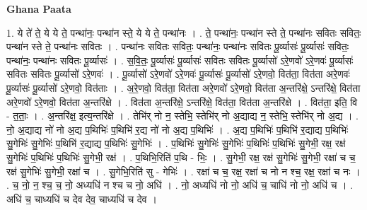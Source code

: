 \documentclass[17pt]{extarticle}
\begin{document}
\textbf{Ghana Paata } \newline

1. ये ते॑ ते॒ ये ये ते॒ पन्था॑नः॒ पन्था॑न स्ते॒ ये ये ते॒ पन्था॑नः । . ते॒ पन्था॑नः॒ पन्था॑न स्ते ते॒ पन्था॑नः सवितः सवितः॒ पन्था॑न स्ते ते॒ पन्था॑नः सवितः । . पन्था॑नः सवितः सवितः॒ पन्था॑नः॒ पन्था॑नः सवितः पू॒र्व्यासः॑ पू॒र्व्यासः॑ सवितः॒ पन्था॑नः॒ पन्था॑नः सवितः पू॒र्व्यासः॑ । . स॒वि॒तः॒ पू॒र्व्यासः॑ पू॒र्व्यासः॑ सवितः सवितः पू॒र्व्यासो॑ ऽरे॒णवो॑ ऽरे॒णवः॑ पू॒र्व्यासः॑ सवितः सवितः पू॒र्व्यासो॑ ऽरे॒णवः॑ । . पू॒र्व्यासो॑ ऽरे॒णवो॑ ऽरे॒णवः॑ पू॒र्व्यासः॑ पू॒र्व्यासो॑ ऽरे॒णवो॒ वित॑ता॒ वित॑ता अरे॒णवः॑ पू॒र्व्यासः॑ पू॒र्व्यासो॑ ऽरे॒णवो॒ वित॑ताः । . अ॒रे॒णवो॒ वित॑ता॒ वित॑ता अरे॒णवो॑ ऽरे॒णवो॒ वित॑ता अ॒न्तरि॑क्षे॒ ऽन्तरि॑क्षे॒ वित॑ता अरे॒णवो॑ ऽरे॒णवो॒ वित॑ता अ॒न्तरि॑क्षे । . वित॑ता अ॒न्तरि॑क्षे॒ ऽन्तरि॑क्षे॒ वित॑ता॒ वित॑ता अ॒न्तरि॑क्षे । . वित॑ता॒ इति॒ वि - त॒ताः॒ । . अ॒न्तरि॑क्ष॒ इत्य॒न्तरि॑क्षे । . तेभि॑र् नो न॒ स्तेभि॒ स्तेभि॑र् नो अ॒द्याद्य न॒ स्तेभि॒ स्तेभि॑र् नो अ॒द्य । . नो॒ अ॒द्याद्य नो॑ नो अ॒द्य प॒थिभिः॑ प॒थिभि॑ र॒द्य नो॑ नो अ॒द्य प॒थिभिः॑ । . अ॒द्य प॒थिभिः॑ प॒थिभि॑ र॒द्याद्य प॒थिभिः॑ सु॒गेभिः॑ सु॒गेभिः॑ प॒थिभि॑ र॒द्याद्य प॒थिभिः॑ सु॒गेभिः॑ । . प॒थिभिः॑ सु॒गेभिः॑ सु॒गेभिः॑ प॒थिभिः॑ प॒थिभिः॑ सु॒गेभी॒ रक्ष॒ रक्ष॑ सु॒गेभिः॑ प॒थिभिः॑ प॒थिभिः॑ सु॒गेभी॒ रक्ष॑ । . प॒थिभि॒रिति॑ प॒थि - भिः॒ । . सु॒गेभी॒ रक्ष॒ रक्ष॑ सु॒गेभिः॑ सु॒गेभी॒ रक्षा॑ च च॒ रक्ष॑ सु॒गेभिः॑ सु॒गेभी॒ रक्षा॑ च । . सु॒गेभि॒रिति॑ सु - गेभिः॑ । . रक्षा॑ च च॒ रक्ष॒ रक्षा॑ च नो न श्च॒ रक्ष॒ रक्षा॑ च नः । . च॒ नो॒ न॒ श्च॒ च॒ नो॒ अध्यधि॑ न श्च च नो॒ अधि॑ । . नो॒ अध्यधि॑ नो नो॒ अधि॑ च॒ चाधि॑ नो नो॒ अधि॑ च । . अधि॑ च॒ चाध्यधि॑ च देव देव॒ चाध्यधि॑ च देव । \newline
\end{document}
